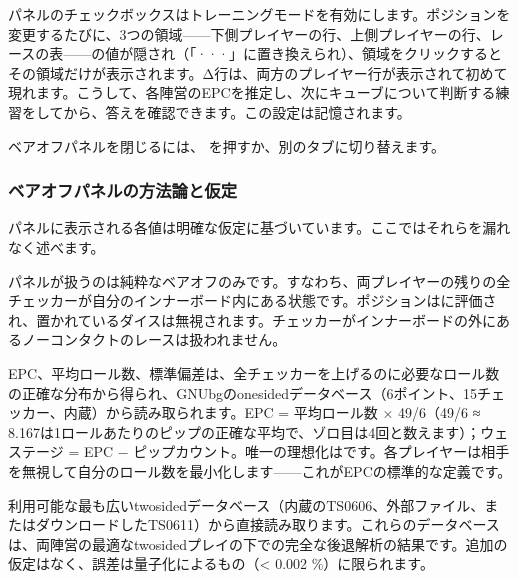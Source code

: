 \documentclass[letterpaper,10pt,dvipdfmx]{sphinxmanual}
\begin{document}
\sphinxAtStartPar
{} パネルのチェックボックスはトレーニングモードを有効にします。ポジションを変更するたびに、3つの領域——下側プレイヤーの行、上側プレイヤーの行、レースの表——の値が隠され（「···」に置き換えられ）、領域をクリックするとその領域だけが表示されます。Δ行は、両方のプレイヤー行が表示されて初めて現れます。こうして、各陣営のEPCを推定し、次にキューブについて判断する練習をしてから、答えを確認できます。この設定は記憶されます。

\sphinxAtStartPar
ベアオフパネルを閉じるには、 を押すか、別のタブに切り替えます。


\subsubsection{ベアオフパネルの方法論と仮定}
\label{\detokenize{manuel:methodologie-et-hypotheses-du-panneau-bearoff}}\label{\detokenize{manuel:epc-methodologie}}
\sphinxAtStartPar
パネルに表示される各値は明確な仮定に基づいています。ここではそれらを漏れなく述べます。

\sphinxAtStartPar
{} パネルが扱うのは純粋なベアオフのみです。すなわち、両プレイヤーの残りの全チェッカーが自分のインナーボード内にある状態です。ポジションはに評価され、置かれているダイスは無視されます。チェッカーがインナーボードの外にあるノーコンタクトのレースは扱われません。

\sphinxAtStartPar
{} EPC、平均ロール数、標準偏差は、全チェッカーを上げるのに必要なロール数の正確な分布から得られ、GNUbgのone\sphinxhyphen{}sidedデータベース（6ポイント、15チェッカー、内蔵）から読み取られます。EPC = 平均ロール数 × 49/6（49/6 ≈ 8.167は1ロールあたりのピップの正確な平均で、ゾロ目は4回と数えます）；ウェステージ = EPC − ピップカウント。唯一の理想化はです。各プレイヤーは相手を無視して自分のロール数を最小化します——これがEPCの標準的な定義です。

\sphinxAtStartPar
{} 利用可能な最も広いtwo\sphinxhyphen{}sidedデータベース（内蔵のTS\sphinxhyphen{}06\sphinxhyphen{}06、外部ファイル、またはダウンロードしたTS\sphinxhyphen{}06\sphinxhyphen{}11）から直接読み取ります。これらのデータベースは、両陣営の最適なtwo\sphinxhyphen{}sidedプレイの下での完全な後退解析の結果です。追加の仮定はなく、誤差は量子化によるもの（\textless{} 0.002 \%）に限られます。
\end{document}
